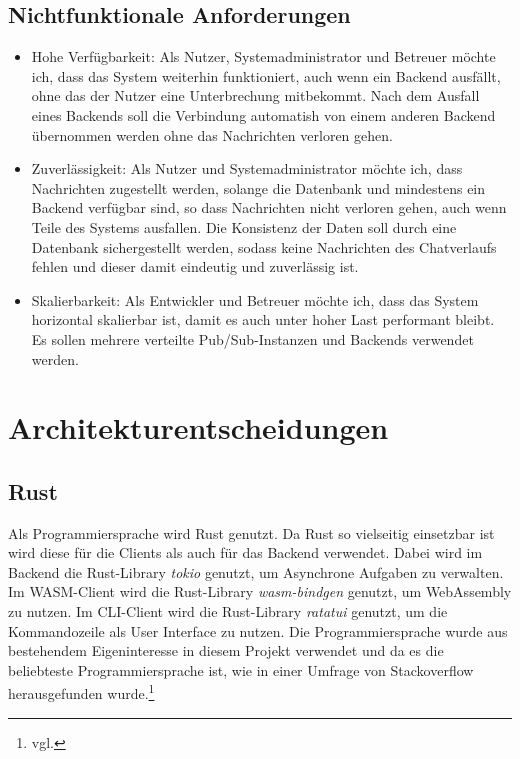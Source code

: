 \subsection{Nichtfunktionale Anforderungen}
\begin{itemize}
  \item Hohe Verfügbarkeit: Als Nutzer, Systemadministrator und Betreuer möchte ich, dass das System weiterhin funktioniert, auch wenn ein Backend ausfällt, ohne das der Nutzer eine Unterbrechung mitbekommt. Nach dem Ausfall eines Backends soll die Verbindung automatish von einem anderen Backend übernommen werden ohne das Nachrichten verloren gehen.
  \item Zuverlässigkeit: Als Nutzer und Systemadministrator möchte ich, dass Nachrichten zugestellt werden, solange die Datenbank und mindestens ein Backend verfügbar sind, so dass Nachrichten nicht verloren gehen, auch wenn Teile des Systems ausfallen. Die Konsistenz der Daten soll durch eine Datenbank sichergestellt werden, sodass keine Nachrichten des Chatverlaufs fehlen und dieser damit eindeutig und zuverlässig ist.
  \item Skalierbarkeit: Als Entwickler und Betreuer möchte ich, dass das System horizontal skalierbar ist, damit es auch unter hoher Last performant bleibt. Es sollen mehrere verteilte Pub/Sub-Instanzen und Backends verwendet werden.
\end{itemize}

\section{Architekturentscheidungen}

\subsection{Rust}
Als Programmiersprache wird Rust genutzt.
Da Rust so vielseitig einsetzbar ist wird diese für die Clients als auch für das Backend verwendet.
Dabei wird im Backend die Rust-Library \textit{tokio} genutzt, um Asynchrone Aufgaben zu verwalten.
Im \ac{WASM}-Client wird die Rust-Library \textit{wasm-bindgen} genutzt, um WebAssembly zu nutzen.
Im \ac{CLI}-Client wird die Rust-Library \textit{ratatui} genutzt, um die Kommandozeile als User Interface zu nutzen.
Die Programmiersprache wurde aus bestehendem Eigeninteresse in diesem Projekt verwendet und da es die beliebteste Programmiersprache ist, wie in einer Umfrage von Stackoverflow herausgefunden wurde.\footnote{vgl. }

